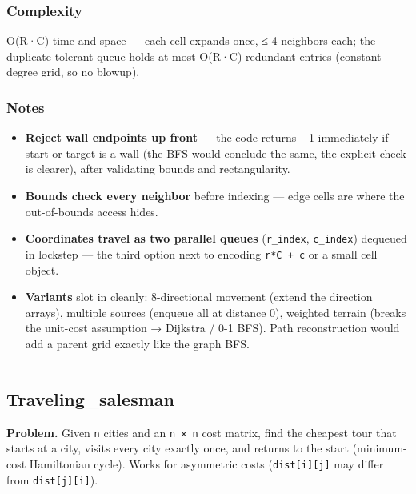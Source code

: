 \documentclass[
  10pt,
  letterpaper,
  onecolumn]{article}
\providecommand{\tightlist}{%
  \setlength{\itemsep}{0pt}\setlength{\parskip}{0pt}}
\begin{document}
\hypertarget{complexity-16}{%
\subsubsection{Complexity}\label{complexity-16}}

O(R·C) time and space --- each cell expands once, ≤ 4 neighbors each;
the duplicate-tolerant queue holds at most O(R·C) redundant entries
(constant-degree grid, so no blowup).

\hypertarget{notes-14}{%
\subsubsection{Notes}\label{notes-14}}

\begin{itemize}
\tightlist
\item
  \textbf{Reject wall endpoints up front} --- the code returns −1
  immediately if start or target is a wall (the BFS would conclude the
  same, the explicit check is clearer), after validating bounds and
  rectangularity.
\item
  \textbf{Bounds check every neighbor} before indexing --- edge cells
  are where the out-of-bounds access hides.
\item
  \textbf{Coordinates travel as two parallel queues} (\texttt{r\_index},
  \texttt{c\_index}) dequeued in lockstep --- the third option next to
  encoding \texttt{r*C\ +\ c} or a small cell object.
\item
  \textbf{Variants} slot in cleanly: 8-directional movement (extend the
  direction arrays), multiple sources (enqueue all at distance 0),
  weighted terrain (breaks the unit-cost assumption → Dijkstra / 0-1
  BFS). Path reconstruction would add a parent grid exactly like the
  graph BFS.
\end{itemize}

\begin{center}\rule{0.5\linewidth}{0.5pt}\end{center}

\hypertarget{traveling_salesman}{%
\subsection{Traveling\_salesman}\label{traveling_salesman}}

\textbf{Problem.} Given \texttt{n} cities and an \texttt{n\ ×\ n} cost
matrix, find the cheapest tour that starts at a city, visits every city
exactly once, and returns to the start (minimum-cost Hamiltonian cycle).
Works for asymmetric costs (\texttt{dist{[}i{]}{[}j{]}} may differ from
\texttt{dist{[}j{]}{[}i{]}}).
\end{document}
